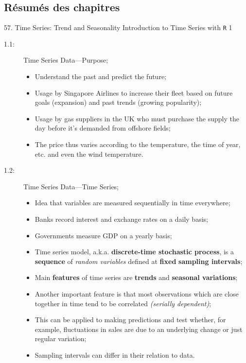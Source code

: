 \subsection{Résumés des chapitres}

\begin{CHPT_SUMM_AUTO}[label = {L.-57}]{57. Time Series: Trend and Seasonality}
Introduction to Time Series with \texttt{R} 1
\begin{description}
	\item[1.1:]	Time Series Data---Purpose;
		\begin{itemize}
		\item	Understand the past and predict the future;
		\item	Usage by Singapore Airlines to increase their fleet based on future goals (expansion) and past trends (growing popularity);
		\item	Usage by gas suppliers in the UK who must purchase the supply the day before it's demanded from offshore fields;
		\item[]	The price thus varies according to the temperature, the time of year, etc. and even the wind temperature.
		\end{itemize}
	\item[1.2:]	Time Series Data---Time Series;
		\begin{itemize}
		\item	Idea that variables are measured sequentially in time everywhere;
		\item[]	Banks record interest and exchange rates on a daily basis;
		\item[]	Governments measure GDP on a yearly basis;
		\item	Time series model, a.k.a. \textbf{discrete-time stochastic process}, is a \textbf{sequence} of \textit{random variables} defined at \textbf{fixed} \textbf{sampling intervals};
		\item	Main \textbf{features} of time series are \textbf{trends} and \textbf{seasonal variations};
		\item	Another important feature is that most observations which are close together in time tend to be correlated \textit{(serially dependent)};
		\item	This can be applied to making predictions and test whether, for example, fluctuations in sales are due to an underlying change or just regular variation;
		\item	Sampling intervals can differ in their relation to data.
			\begin{itemize}

\end{itemize}
\end{itemize}
\end{description}
\end{CHPT_SUMM_AUTO}
